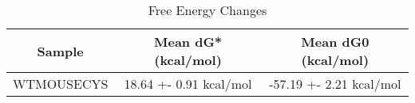\documentclass{article}
\begin{document}
\begin{table}[ht]
    \centering
    \begin{tabular}{|c|c|c|}
    \hline
    Sample & Mean dG* (kcal/mol) & Mean dG0 (kcal/mol) \\
    \hline
    WTMOUSECYS & 18.64 +- 0.91 kcal/mol & -57.19 +- 2.21 kcal/mol \\
    \hline
    \end{tabular}
    \caption{Free Energy Changes}
\end{table}
\end{document}
